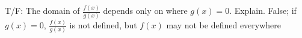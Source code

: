 {T/F: The domain of $\frac{f(x)}{g(x)}$ depends only on where $g(x)=0$. Explain.}
{False; if $g(x)=0$, $\frac{f(x)}{g(x)}$ is not defined, but $f(x)$ may not be defined everywhere}
